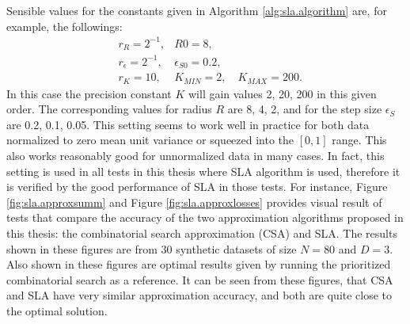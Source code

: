 Sensible values for the constants given in Algorithm
\ref{alg:sla.algorithm} are, for example, the followings:
\[ \begin{array} {lll}
& r_R = 2^{-1}, &R0 = 8, \\
& r_\epsilon = 2^{-1}, &\epsilon_{S0} = 0.2, \\
& r_K = 10, &K_{MIN} = 2, \quad K_{MAX} = 200.
\end{array} \] 
In this case the precision constant $K$ will gain values 2, 20, 200 in
this given order. The corresponding values for radius $R$ are 8, 4, 2,
and for the step size $\epsilon_S$ are 0.2, 0.1, 0.05. This setting
seems to work well in practice for both data normalized to zero mean
unit variance or squeezed into the $[0,1]$ range. This also works
reasonably good for unnormalized data in many cases. In fact, this
setting is used in all tests in this thesis where SLA algorithm is
used, therefore it is verified by the good performance of SLA in those
tests. For instance, Figure \ref{fig:sla.approxsumm} and Figure
\ref{fig:sla.approxlosses} provides visual result of tests that
compare the accuracy of the two approximation algorithms proposed in
this thesis: the combinatorial search approximation (CSA) and SLA. The
results shown in these figures are from 30 synthetic datasets of size
$N=80$ and $D=3$. Also shown in these figures are optimal results
given by running the prioritized combinatorial search as a
reference. It can be seen from these figures, that CSA and SLA have
very similar approximation accuracy, and both are quite close to the
optimal solution.
